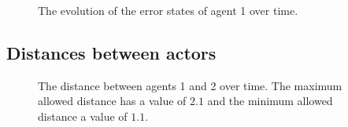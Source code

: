 \begin{figure}[H]\centering
  \scalebox{0.7}{}
  \caption{The evolution of the error states of agent 1 over time.}
  \label{fig:d_OFF_3_2_errors_agent_1}
\end{figure}

\noindent{}


\subsection{Distances between actors}
\label{subsection:distances_3_2}

\begin{figure}[H]\centering
  \scalebox{0.7}{}
  \caption{The distance between agents 1 and 2 over time. The maximum allowed
    distance has a value of $2.1$ and the minimum allowed distance a value
    of $1.1$.}
  \label{fig:d_OFF_3_2_distance_agents_12}
\end{figure}

